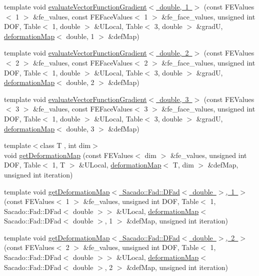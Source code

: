 \begin{DoxyCompactItemize}
\item 
template void \mbox{\hyperlink{function_evaluations_8cc_a20af37a91c353a81f4d9ad3b2dd678af}{evaluate\+Vector\+Function\+Gradient$<$ double, 1 $>$}} (const F\+E\+Values$<$ 1 $>$ \&fe\+\_\+values, const F\+E\+Face\+Values$<$ 1 $>$ \&fe\+\_\+face\+\_\+values, unsigned int D\+OF, Table$<$ 1, double $>$ \&U\+Local, Table$<$ 3, double $>$ \&gradU, \mbox{\hyperlink{structdeformation_map}{deformation\+Map}}$<$ double, 1 $>$ \&def\+Map)
\item 
template void \mbox{\hyperlink{function_evaluations_8cc_a60c8d8f11fc75f1a2d1775dd5ea95d79}{evaluate\+Vector\+Function\+Gradient$<$ double, 2 $>$}} (const F\+E\+Values$<$ 2 $>$ \&fe\+\_\+values, const F\+E\+Face\+Values$<$ 2 $>$ \&fe\+\_\+face\+\_\+values, unsigned int D\+OF, Table$<$ 1, double $>$ \&U\+Local, Table$<$ 3, double $>$ \&gradU, \mbox{\hyperlink{structdeformation_map}{deformation\+Map}}$<$ double, 2 $>$ \&def\+Map)
\item 
template void \mbox{\hyperlink{function_evaluations_8cc_a9aaa007fb989c138e170beb650e31c31}{evaluate\+Vector\+Function\+Gradient$<$ double, 3 $>$}} (const F\+E\+Values$<$ 3 $>$ \&fe\+\_\+values, const F\+E\+Face\+Values$<$ 3 $>$ \&fe\+\_\+face\+\_\+values, unsigned int D\+OF, Table$<$ 1, double $>$ \&U\+Local, Table$<$ 3, double $>$ \&gradU, \mbox{\hyperlink{structdeformation_map}{deformation\+Map}}$<$ double, 3 $>$ \&def\+Map)
\item 
{\footnotesize template$<$class T , int dim$>$ }\\void \mbox{\hyperlink{group___evaluation_functions_ga62b026b5bcee0bda21159ff6782b4b59}{get\+Deformation\+Map}} (const F\+E\+Values$<$ dim $>$ \&fe\+\_\+values, unsigned int D\+OF, Table$<$ 1, T $>$ \&U\+Local, \mbox{\hyperlink{structdeformation_map}{deformation\+Map}}$<$ T, dim $>$ \&def\+Map, unsigned int iteration)
\item 
template void \mbox{\hyperlink{function_evaluations_8cc_a03a34b508ad64e47d31b1b36a05f4e7b}{get\+Deformation\+Map$<$ Sacado\+::\+Fad\+::\+D\+Fad$<$ double $>$, 1 $>$}} (const F\+E\+Values$<$ 1 $>$ \&fe\+\_\+values, unsigned int D\+OF, Table$<$ 1, Sacado\+::\+Fad\+::\+D\+Fad$<$ double $>$$>$ \&U\+Local, \mbox{\hyperlink{structdeformation_map}{deformation\+Map}}$<$ Sacado\+::\+Fad\+::\+D\+Fad$<$ double $>$, 1 $>$ \&def\+Map, unsigned int iteration)
\item 
template void \mbox{\hyperlink{function_evaluations_8cc_a024d1c1e0bf1b0c62eb8e8eba210e04f}{get\+Deformation\+Map$<$ Sacado\+::\+Fad\+::\+D\+Fad$<$ double $>$, 2 $>$}} (const F\+E\+Values$<$ 2 $>$ \&fe\+\_\+values, unsigned int D\+OF, Table$<$ 1, Sacado\+::\+Fad\+::\+D\+Fad$<$ double $>$$>$ \&U\+Local, \mbox{\hyperlink{structdeformation_map}{deformation\+Map}}$<$ Sacado\+::\+Fad\+::\+D\+Fad$<$ double $>$, 2 $>$ \&def\+Map, unsigned int iteration)

\end{DoxyCompactItemize}
